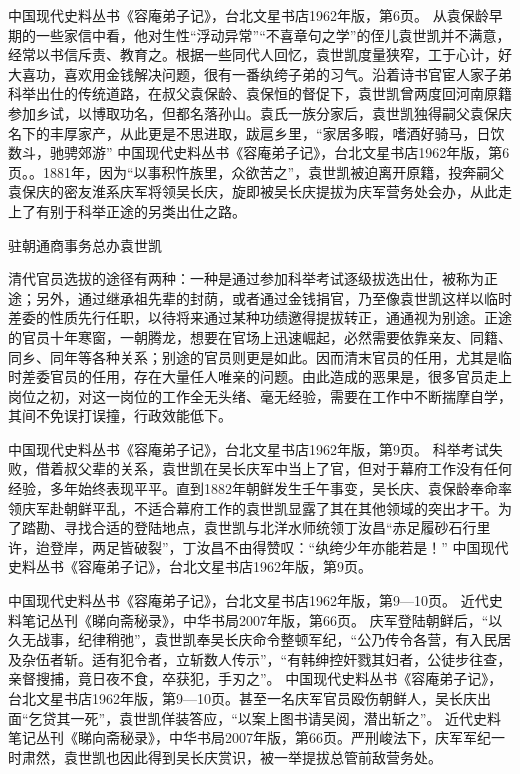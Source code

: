 \documentclass[12pt,UTF8]{ctexbook}
\begin{document}
中国现代史料丛书《容庵弟子记》，台北文星书店1962年版，第6页。
从袁保龄早期的一些家信中看，他对生性“浮动异常”“不喜章句之学”的侄儿袁世凯并不满意，经常以书信斥责、教育之。根据一些同代人回忆，袁世凯度量狭窄，工于心计，好大喜功，喜欢用金钱解决问题，很有一番纨绔子弟的习气。沿着诗书官宦人家子弟科举出仕的传统道路，在叔父袁保龄、袁保恒的督促下，袁世凯曾两度回河南原籍参加乡试，以博取功名，但都名落孙山。袁氏一族分家后，袁世凯独得嗣父袁保庆名下的丰厚家产，从此更是不思进取，跋扈乡里，“家居多暇，嗜酒好骑马，日饮数斗，驰骋郊游” 中国现代史料丛书《容庵弟子记》，台北文星书店1962年版，第6页。。1881年，因为“以事积忤族里，众欲苦之”，袁世凯被迫离开原籍，投奔嗣父袁保庆的密友淮系庆军将领吴长庆，旋即被吴长庆提拔为庆军营务处会办，从此走上了有别于科举正途的另类出仕之路。


驻朝通商事务总办袁世凯

清代官员选拔的途径有两种：一种是通过参加科举考试逐级拔选出仕，被称为正途；另外，通过继承祖先辈的封荫，或者通过金钱捐官，乃至像袁世凯这样以临时差委的性质先行任职，以待将来通过某种功绩邀得提拔转正，通通视为别途。正途的官员十年寒窗，一朝腾龙，想要在官场上迅速崛起，必然需要依靠亲友、同籍、同乡、同年等各种关系；别途的官员则更是如此。因而清末官员的任用，尤其是临时差委官员的任用，存在大量任人唯亲的问题。由此造成的恶果是，很多官员走上岗位之初，对这一岗位的工作全无头绪、毫无经验，需要在工作中不断揣摩自学，其间不免误打误撞，行政效能低下。

中国现代史料丛书《容庵弟子记》，台北文星书店1962年版，第9页。
科举考试失败，借着叔父辈的关系，袁世凯在吴长庆军中当上了官，但对于幕府工作没有任何经验，多年始终表现平平。直到1882年朝鲜发生壬午事变，吴长庆、袁保龄奉命率领庆军赴朝鲜平乱，不适合幕府工作的袁世凯显露了其在其他领域的突出才干。为了踏勘、寻找合适的登陆地点，袁世凯与北洋水师统领丁汝昌“赤足履砂石行里许，迨登岸，两足皆破裂”，丁汝昌不由得赞叹：“纨绔少年亦能若是！” 中国现代史料丛书《容庵弟子记》，台北文星书店1962年版，第9页。

中国现代史料丛书《容庵弟子记》，台北文星书店1962年版，第9—10页。
近代史料笔记丛刊《睇向斋秘录》，中华书局2007年版，第66页。
庆军登陆朝鲜后，“以久无战事，纪律稍弛”，袁世凯奉吴长庆命令整顿军纪，“公乃传令各营，有入民居及杂伍者斩。适有犯令者，立斩数人传示”，“有韩绅控奸戮其妇者，公徒步往查，亲督搜捕，竟日夜不食，卒获犯，手刃之”。 中国现代史料丛书《容庵弟子记》，台北文星书店1962年版，第9—10页。甚至一名庆军官员殴伤朝鲜人，吴长庆出面“乞贷其一死”，袁世凯佯装答应，“以案上图书请吴阅，潜出斩之”。 近代史料笔记丛刊《睇向斋秘录》，中华书局2007年版，第66页。严刑峻法下，庆军军纪一时肃然，袁世凯也因此得到吴长庆赏识，被一举提拔总管前敌营务处。
\end{document}
